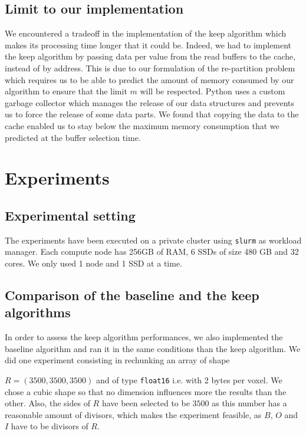 \documentclass[sigconf, nonacm]{acmart}
\begin{document}
\subsection{Limit to our implementation}
We encountered a tradeoff in the implementation of the keep algorithm which
makes its processing time longer that it could be.
Indeed, we had to implement the keep algorithm by passing data per value from
the read buffers to the cache, instead of by address.
This is due to our formulation of the re-partition problem which requires us to
be able to predict the amount of memory consumed by our algorithm to ensure that
the limit $m$ will be respected.
Python uses a custom garbage collector which manages the release of our
data structures and prevents us to force the release of some data parts.
We found that copying the data to the cache enabled us to stay below the
maximum memory consumption that we predicted at the buffer selection time.

\section{Experiments}

\subsection{Experimental setting}
The experiments have been executed on a private
cluster using \texttt{slurm} as workload manager. Each compute node has 256GB of
RAM, 6 SSDs of size 480 GB and 32 cores. We only used 1 node and 1 SSD at a
time.

\subsection{Comparison of the baseline and the keep algorithms}
In order to assess the keep algorithm performances, we also implemented the
baseline algorithm and ran it in the same conditions than the keep algorithm.
We did one experiment consisting in rechunking an array of shape

$R=(3500,3500,3500)$ and of type \texttt{float16} i.e. with 2 bytes per voxel.
We chose a cubic shape so that no dimension influences more the results than
the other.
Also, the sides of $R$ have been selected to be $3500$ as this number has a
reasonable amount of divisors, which makes the experiment feasible, as
$B$, $O$ and $I$ have to be divisors of $R$.
\end{document}
